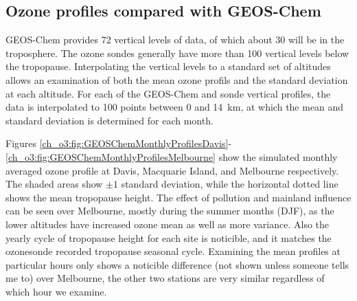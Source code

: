   \subsection{Ozone profiles compared with GEOS-Chem}
    GEOS-Chem provides 72 vertical levels of data, of which about 30 will be in the troposphere.
    The ozone sondes generally have more than 100 vertical levels below the tropopause.
    Interpolating the vertical levels to a standard set of altitudes allows an examination of both the mean ozone profils and the standard deviation at each altitude.
    For each of the GEOS-Chem and sonde vertical profiles, the data is interpolated to 100 points between 0 and 14~km, at which the mean and standard deviation is determined for each month.
    
    Figures \ref{ch_o3:fig:GEOSChemMonthlyProfilesDavis}-\ref{ch_o3:fig:GEOSChemMonthlyProfilesMelbourne} show the simulated monthly averaged ozone profile at Davis, Macquarie Island, and Melbourne respectively.
    The shaded areas show $\pm 1$ standard deviation, while the horizontal dotted line shows the mean tropopause height.
    The effect of pollution and mainland influence can be seen over Melbourne, mostly during the summer months (DJF), as the lower altitudes have increased ozone mean as well as more variance.
    Also the yearly cycle of tropopause height for each site is noticible, and it matches the ozonesonde recorded tropopause seasonal cycle.
    Examining the mean profiles at particular hours only shows a noticible difference (not shown unless someone tells me to) over Melbourne, the other two stations are very similar regardless of which hour we examine.
    
